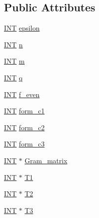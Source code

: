 \subsection*{Public Attributes}
\begin{DoxyCompactItemize}
\item 
\mbox{\hyperlink{galois_8h_a09fddde158a3a20bd2dcadb609de11dc}{I\+NT}} \mbox{\hyperlink{classorthogonal_a0546f22747068652be14a608f51f5566}{epsilon}}
\item 
\mbox{\hyperlink{galois_8h_a09fddde158a3a20bd2dcadb609de11dc}{I\+NT}} \mbox{\hyperlink{classorthogonal_a2cd5494a7d4c21cb8b64262bf1638792}{n}}
\item 
\mbox{\hyperlink{galois_8h_a09fddde158a3a20bd2dcadb609de11dc}{I\+NT}} \mbox{\hyperlink{classorthogonal_afda2cc9b0c6e5d09dba13f94931acd1c}{m}}
\item 
\mbox{\hyperlink{galois_8h_a09fddde158a3a20bd2dcadb609de11dc}{I\+NT}} \mbox{\hyperlink{classorthogonal_ade0f6815ca7a898b45f5e3b91418928c}{q}}
\item 
\mbox{\hyperlink{galois_8h_a09fddde158a3a20bd2dcadb609de11dc}{I\+NT}} \mbox{\hyperlink{classorthogonal_a66f900b63cb10da58e1a72e4beaf1bff}{f\+\_\+even}}
\item 
\mbox{\hyperlink{galois_8h_a09fddde158a3a20bd2dcadb609de11dc}{I\+NT}} \mbox{\hyperlink{classorthogonal_a999452e172108fc71be9b63248727b28}{form\+\_\+c1}}
\item 
\mbox{\hyperlink{galois_8h_a09fddde158a3a20bd2dcadb609de11dc}{I\+NT}} \mbox{\hyperlink{classorthogonal_a4dd33fe185ce628b6ad8c6db74269f11}{form\+\_\+c2}}
\item 
\mbox{\hyperlink{galois_8h_a09fddde158a3a20bd2dcadb609de11dc}{I\+NT}} \mbox{\hyperlink{classorthogonal_a1e8720f54cad9a643bacd4818d47486b}{form\+\_\+c3}}
\item 
\mbox{\hyperlink{galois_8h_a09fddde158a3a20bd2dcadb609de11dc}{I\+NT}} $\ast$ \mbox{\hyperlink{classorthogonal_ac9f89f8068557c6253c7cd44bd6c0922}{Gram\+\_\+matrix}}
\item 
\mbox{\hyperlink{galois_8h_a09fddde158a3a20bd2dcadb609de11dc}{I\+NT}} $\ast$ \mbox{\hyperlink{classorthogonal_a0850bed15dee35673e86d8879c428f86}{T1}}
\item 
\mbox{\hyperlink{galois_8h_a09fddde158a3a20bd2dcadb609de11dc}{I\+NT}} $\ast$ \mbox{\hyperlink{classorthogonal_a6675ddcb245c7c85e0e2224d6ab51497}{T2}}
\item 
\mbox{\hyperlink{galois_8h_a09fddde158a3a20bd2dcadb609de11dc}{I\+NT}} $\ast$ \mbox{\hyperlink{classorthogonal_ab582438d355088f334826f963c8653f5}{T3}}

\end{DoxyCompactItemize}
